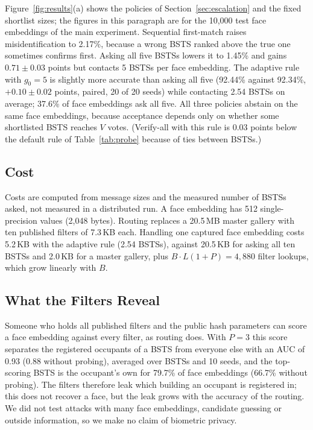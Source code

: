 \documentclass[pdflatex,sn-mathphys-num]{sn-jnl}%
\theoremstyle{thmstyleone}%
\theoremstyle{thmstyletwo}%
\theoremstyle{thmstylethree}%
\begin{document}
Figure~\ref{fig:results}(a) shows the policies of Section~\ref{sec:escalation} and the fixed shortlist sizes; the figures in this paragraph are for the 10,000 test face embeddings of the main experiment. Sequential first-match raises misidentification to 2.17\%, because a wrong BSTS ranked above the true one sometimes confirms first. Asking all five BSTSs lowers it to 1.45\% and gains $0.71 \pm 0.03$ points but contacts 5 BSTSs per face embedding. The adaptive rule with $g_0=5$ is slightly more accurate than asking all five (92.44\% against 92.34\%, $+0.10 \pm 0.02$ points, paired, 20 of 20 seeds) while contacting 2.54 BSTSs on average; 37.6\% of face embeddings ask all five. All three policies abstain on the same face embeddings, because acceptance depends only on whether some shortlisted BSTS reaches $V$ votes. (Verify-all with this rule is 0.03 points below the default rule of Table~\ref{tab:probe} because of ties between BSTSs.)

\subsection{Cost}
\label{sec:cost}

Costs are computed from message sizes and the measured number of BSTSs asked, not measured in a distributed run. A face embedding has 512 single-precision values (2,048 bytes). Routing replaces a 20.5\,MB master gallery with ten published filters of 7.3\,KB each. Handling one captured face embedding costs 5.2\,KB with the adaptive rule (2.54 BSTSs), against 20.5\,KB for asking all ten BSTSs and 2.0\,KB for a master gallery, plus $B\cdot L(1+P)=4{,}880$ filter lookups, which grow linearly with $B$.

\subsection{What the Filters Reveal}
\label{sec:leak}

Someone who holds all published filters and the public hash parameters can score a face embedding against every filter, as routing does. With $P=3$ this score separates the registered occupants of a BSTS from everyone else with an AUC of 0.93 (0.88 without probing), averaged over BSTSs and 10 seeds, and the top-scoring BSTS is the occupant's own for 79.7\% of face embeddings (66.7\% without probing). The filters therefore leak which building an occupant is registered in; this does not recover a face, but the leak grows with the accuracy of the routing. We did not test attacks with many face embeddings, candidate guessing or outside information, so we make no claim of biometric privacy.
\end{document}
